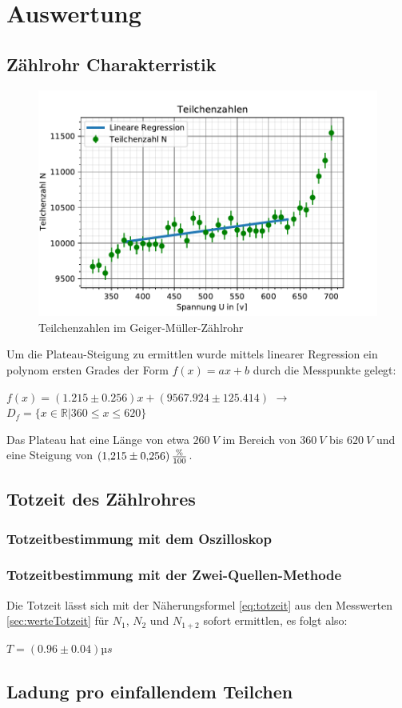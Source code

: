 \section{Auswertung}
\label{sec:auswertung}

\subsection{Zählrohr Charakterristik}
\label{sec:characteristik}

\begin{figure}
    \centering
    \includegraphics{kennlinie.pdf}
    \caption{Teilchenzahlen im Geiger-Müller-Zählrohr}
    \label{fig:teilchenzahl}
  \end{figure}
Um die Plateau-Steigung zu ermittlen wurde mittels linearer Regression ein polynom ersten Grades der 
Form $f(x)=ax+b$ durch die Messpunkte gelegt:
\begin{center}
    $f(x)=(1.215\pm0.256)x + (9567.924\pm125.414)$ $\rightarrow$ $D_f=\{x\in\mathbb{R} \vert 360\le x\le620\}$    
\end{center}
Das Plateau hat eine Länge von etwa $\SI{260}{V}$ im Bereich von $\SI{360}{V}$ bis $\SI{620}{V}$ und  eine 
Steigung von $\SI{1,215\pm0,256}{\frac{\%}{100}}$.
\subsection{Totzeit des Zählrohres}
\label{sec:totzeit}
\subsubsection{Totzeitbestimmung mit dem Oszilloskop}
\label{sec:totzeitO}
\subsubsection{Totzeitbestimmung mit der Zwei-Quellen-Methode}
\label{sec:totzeitZ}
Die Totzeit lässt sich mit der Näherungsformel \autoref{eq:totzeit} aus den Messwerten 
\autoref{sec:werteTotzeit} für $N_1$, $N_2$ und $N_{1+2}$ sofort ermittlen, es folgt also:
\begin{center}
  $T=(0.96\pm0.04) µs$
\end{center}
\subsection{Ladung pro einfallendem Teilchen}
\label{sec:ladung}
